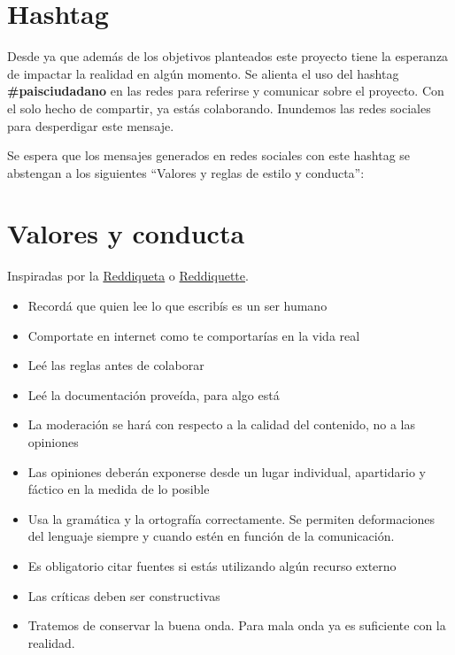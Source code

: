 \documentclass[
]{book}
\providecommand{\tightlist}{%
  \setlength{\itemsep}{0pt}\setlength{\parskip}{0pt}}
\begin{document}
\hypertarget{hashtag}{%
\section{Hashtag}\label{hashtag}}

Desde ya que además de los objetivos planteados este proyecto tiene la esperanza de impactar la realidad en algún momento. Se alienta el uso del hashtag \textbf{\#paisciudadano} en las redes para referirse y comunicar sobre el proyecto. Con el solo hecho de compartir, ya estás colaborando. Inundemos las redes sociales para desperdigar este mensaje.

Se espera que los mensajes generados en redes sociales con este hashtag se abstengan a los siguientes ``Valores y reglas de estilo y conducta'':

\hypertarget{valores-y-conducta}{%
\section{Valores y conducta}\label{valores-y-conducta}}

Inspiradas por la \href{https://www.reddit.com/wiki/es/reddiquette}{Reddiqueta} o \href{https://reddit.zendesk.com/hc/en-us/articles/205926439-Reddiquette}{Reddiquette}.

\begin{itemize}
\tightlist
\item
  Recordá que quien lee lo que escribís es un ser humano
\item
  Comportate en internet como te comportarías en la vida real
\item
  Leé las reglas antes de colaborar
\item
  Leé la documentación proveída, para algo está
\item
  La moderación se hará con respecto a la calidad del contenido, no a las opiniones
\item
  Las opiniones deberán exponerse desde un lugar individual, apartidario y fáctico en la medida de lo posible
\item
  Usa la gramática y la ortografía correctamente. Se permiten deformaciones del lenguaje siempre y cuando estén en función de la comunicación.
\item
  Es obligatorio citar fuentes si estás utilizando algún recurso externo
\item
  Las críticas deben ser constructivas
\item
  Tratemos de conservar la buena onda. Para mala onda ya es suficiente con la realidad.
\end{itemize}
\end{document}

